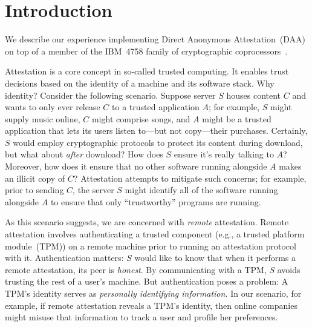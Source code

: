 \section{Introduction}

\begin{comment}
	\emph{PDS:}
	Our goal is to motivate and sketch out our work.
	
	At the moment, I've simply dropped in a copy of our proposal.
	Even if those ideas suffice, we clearly need to adjust the text since
	we're now talking about what we have done rather
	than what we propose to do.
	
	Let's consider improving the ideas.
	
	I want to move away from
	TCG-style attestation to the more general problem of
	\emph{authenticating a remote application}.
	Identifying
	all of the software running on a machine may well uniquely
	identify the machine.
	Authentication without inherently leaking identity enables
	attestation. What other protocols does it enable?
	Voting protocols?
\end{comment}
\fi

We describe our experience implementing Direct Anonymous Attestation~(DAA) on top of
a member of the IBM~4758 family of
cryptographic coprocessors~\cite{daa,smith:design}.

Attestation is a core concept in so-called trusted computing.
It enables trust decisions based on the identity of a machine
and its software stack.
Why identity?
Consider the following scenario.
Suppose server $S$ houses content $C$ and wants to
only ever release $C$ to a trusted application $A$;
for example, $S$ might supply music online,
$C$ might comprise songs,
and $A$ might be a trusted application that
lets its users listen to---but not copy---their purchases.
Certainly, $S$ would employ cryptographic protocols to protect
its content during download, but what about \emph{after} download?
How does $S$ ensure it's really talking to $A$? Moreover, how does
it ensure that no other software running alongside $A$ makes an illicit
copy of $C$?
Attestation attempts to mitigate such concerns; for example,
prior to sending $C$, the server $S$ might identify all of the
software running alongside $A$ to ensure that only ``trustworthy'' programs
are running.

As this scenario suggests, we are concerned with \emph{remote} attestation.
Remote attestation involves authenticating a trusted component (e.g., a trusted platform module~(TPM))
on a remote machine prior to running an attestation protocol
with it.
Authentication matters: $S$ would like to know that when it performs a remote attestation,
its peer is \emph{honest}.
By communicating with a TPM, $S$ avoids trusting
the rest of a user's machine.
But authentication poses a problem: A TPM's identity serves as
\emph{personally identifying information.}
In our scenario, for example, if remote attestation reveals a TPM's identity, then
online companies might misuse that information to track a user and profile
her preferences.

